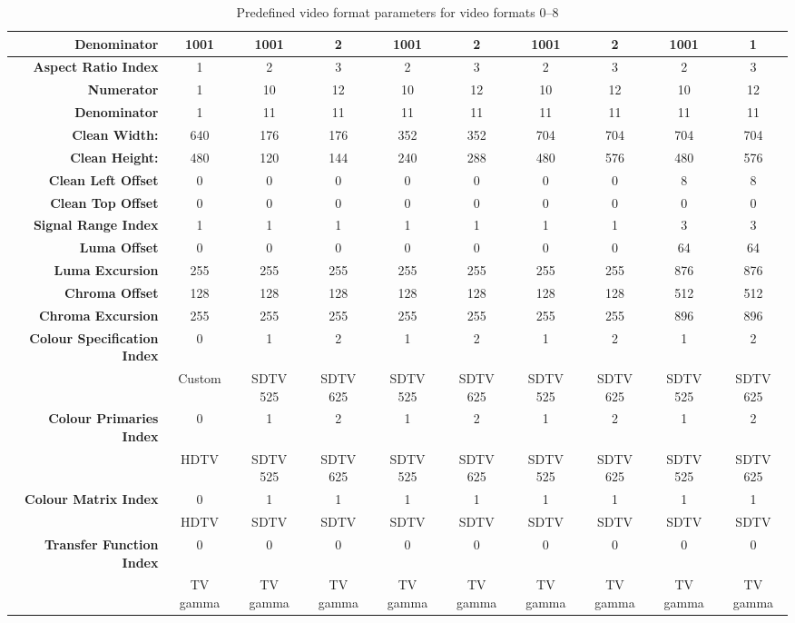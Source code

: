 \begin{sidewaystable}[!ht]
\begin{tabular}{|r|c|c|c|c|c|c|c|c|c|}
{\bf Denominator} & 1001 & 1001   &  2   & 1001  &  2 & 1001  & 2     & 1001  & 1\\
\hline
{\bf Aspect Ratio Index} &1 &2 &3 &2 &3 &2 &3 &2 &3\\
{\bf Numerator} & 1   & 10 & 12 & 10 & 12 & 10 & 12 & 10 & 12\\
{\bf Denominator}& 1 & 11 &11 & 11 &  11 & 11 & 11 & 11  & 11\\
\hline
{\bf Clean Width:}&640&176&176&352&352&704&704&704&704\\
{\bf Clean Height:}&480&120&144&240&288&480&576&480&576\\
{\bf Clean Left Offset} & 0 & 0 &0 &0 &0 &0 &0 &8 &8\\
{\bf Clean Top Offset} & 0 &0 &0 &0 &0 &0 &0 &0 &0\\
\hline
{\bf Signal Range Index} &1 &1 &1 &1 &1 &1 &1 &3 & 3\\
{\bf Luma Offset} &0 &0 &0 &0 &0 &0 &0 &64 &64\\
{\bf Luma Excursion} &255 &255 &255 &255 &255 &255 &255 &876 & 876\\
{\bf Chroma Offset} &128 &128 &128 &128 &128 &128 &128 &512 & 512\\
{\bf Chroma Excursion} &255 &255 &255 &255 &255 &255 &255 & 896 & 896\\
\hline
{\bf Colour Specification Index} &0 & 1 & 2& 1&	2&1 & 2& 1&	2\\
&Custom&SDTV 525&SDTV 625&SDTV 525&SDTV 625&SDTV 525&SDTV 625&SDTV 525&SDTV 625\\
\hline
{\bf Colour Primaries Index} &0&	1&2&1&2&1&2&1&2\\
&HDTV&SDTV 525&SDTV 625&SDTV 525&SDTV 625&SDTV 525&SDTV 625&SDTV 525&SDTV 625\\
\hline
{\bf Colour Matrix Index} &0&1&1&1&1&1&1&1&1\\
&HDTV&SDTV&SDTV&SDTV&SDTV&SDTV&SDTV&SDTV&SDTV\\
\hline
{\bf Transfer Function Index} &0&0&0&0&0&0&0&0&0\\
&TV gamma&TV gamma&TV gamma&TV gamma&TV gamma&TV gamma&TV gamma&TV gamma&TV gamma\\
\hline
\end{tabular}
\caption{Predefined video format parameters for video formats 0--8}
\end{sidewaystable}

